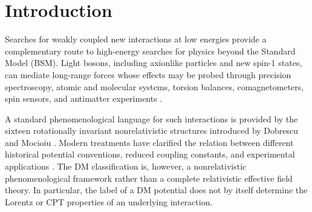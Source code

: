 \documentclass[aps,prd,reprint,superscriptaddress,nofootinbib]{revtex4-2}
\begin{document}
\begin{abstract}
		A compiled registry contains 273 constraint records, of which 258 are
		admitted to the present analysis. Nineteen analysed records involve
		antimatter, and eleven matter--antimatter pairs satisfy the adopted
		matching requirements in coupling convention, operator label, fermion
		sector, and interaction range. The resulting bound-based asymmetries
		span approximately $0.33$--$1$ in magnitude, but their size is not
		evidence for CPT violation. The present coverage is strongly
		matter-dominated, with substantial deficits in electron--nucleus,
		neutron--nucleus, and proton--nucleus sectors. We formulate a practical
		two-stage programme in which balanced sensitivity regions are first
		identified through a sensitivity-ratio function and genuine CPT
		tests are subsequently performed using signed observables or full
		likelihood functions.
		
	\end{abstract}
	
	\maketitle
	
	\section{Introduction}
	
	Searches for weakly coupled new interactions at low energies provide a
	complementary route to high-energy searches for physics beyond the
	Standard Model (BSM). Light bosons, including axionlike particles and
	new spin-1 states, can mediate long-range forces whose effects may be
	probed through precision spectroscopy, atomic and molecular systems,
	torsion balances, comagnetometers, spin sensors, and antimatter
	experiments \cite{MoodyWilczek1984,DobrescuMocioiu2006,
		Cong2025,WuYan2026}.
	
	A standard phenomenological language for such interactions is provided
	by the sixteen rotationally invariant nonrelativistic structures
	introduced by Dobrescu and Mocioiu \cite{DobrescuMocioiu2006}.
	Modern treatments have clarified the relation between different
	historical potential conventions, reduced coupling constants, and
	experimental applications \cite{Cong2025}. The DM classification is,
	however, a nonrelativistic phenomenological framework rather than a
	complete relativistic effective field theory. In particular, the label
	of a DM potential does not by itself determine the Lorentz or CPT
	properties of an underlying interaction.
	
\end{document}
